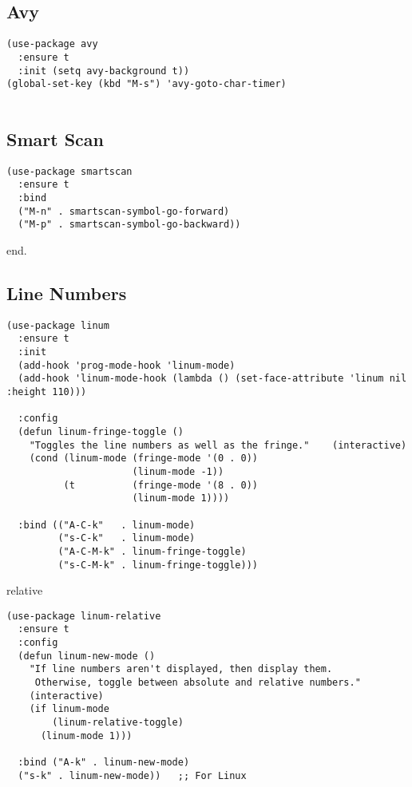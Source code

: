 \documentclass[12pt]{article}
\begin{document}
\subsection{Avy}
\label{sec:org2b50ff4}

\lstset{language=Lisp,label= ,caption= ,captionpos=b,numbers=none}
\begin{lstlisting}
(use-package avy
  :ensure t
  :init (setq avy-background t))
(global-set-key (kbd "M-s") 'avy-goto-char-timer)


\end{lstlisting}

\subsection{Smart Scan}
\label{sec:org05234c0}


\lstset{language=Lisp,label= ,caption= ,captionpos=b,numbers=none}
\begin{lstlisting}
(use-package smartscan
  :ensure t
  :bind
  ("M-n" . smartscan-symbol-go-forward)
  ("M-p" . smartscan-symbol-go-backward))

\end{lstlisting}

end.

\subsection{Line Numbers}
\label{sec:orgc7cbb57}


\lstset{language=Lisp,label= ,caption= ,captionpos=b,numbers=none}
\begin{lstlisting}
(use-package linum
  :ensure t
  :init
  (add-hook 'prog-mode-hook 'linum-mode)
  (add-hook 'linum-mode-hook (lambda () (set-face-attribute 'linum nil :height 110)))

  :config
  (defun linum-fringe-toggle ()
    "Toggles the line numbers as well as the fringe."    (interactive)
    (cond (linum-mode (fringe-mode '(0 . 0))
                      (linum-mode -1))
          (t          (fringe-mode '(8 . 0))
                      (linum-mode 1))))

  :bind (("A-C-k"   . linum-mode)
         ("s-C-k"   . linum-mode)
         ("A-C-M-k" . linum-fringe-toggle)
         ("s-C-M-k" . linum-fringe-toggle)))

\end{lstlisting}


relative
\lstset{language=Lisp,label= ,caption= ,captionpos=b,numbers=none}
\begin{lstlisting}
(use-package linum-relative
  :ensure t
  :config
  (defun linum-new-mode ()
    "If line numbers aren't displayed, then display them.
     Otherwise, toggle between absolute and relative numbers."
    (interactive)
    (if linum-mode
        (linum-relative-toggle)
      (linum-mode 1)))

  :bind ("A-k" . linum-new-mode)
  ("s-k" . linum-new-mode))   ;; For Linux
\end{lstlisting}
\end{document}
